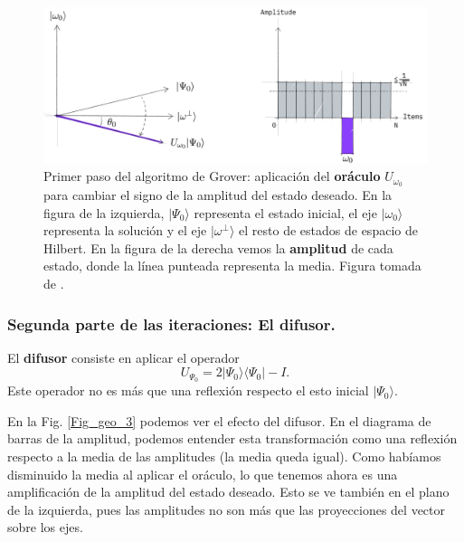 \documentclass[a4paper,11pt]{article} %
\numberwithin{equation}{section}
\begin{document}
	\begin{figure}[H]
	\centering 
	\includegraphics[width=0.85\linewidth]{Figuras/Fig_geo_2.png}
	\caption{Primer paso del algoritmo de Grover: aplicación del \textbf{oráculo} $U_{\omega_0}$ 
	para cambiar el signo de la amplitud del estado deseado. En la figura de la izquierda, 
	$| \Psi_0 \rangle$ representa el estado inicial, el eje $|\omega_0 \rangle $ 
	representa la solución y el eje $| \omega^{\perp} \rangle$ el resto de estados de espacio de Hilbert. 
	En la figura de la derecha vemos la \textbf{amplitud} de cada estado, donde la línea punteada 
	representa la media. Figura tomada de \cite{Qiskit-Grover}.}
	\label{Fig_geo_2}
	\end{figure}







\subsubsection{Segunda parte de las iteraciones: El difusor.}

El \textbf{difusor} consiste en aplicar el operador 
\begin{equation} \label{ec_geo_Us}
\boxed{U_{\Psi_0} = 2 |\Psi_0 \rangle \langle \Psi_0 | - I }.
\end{equation}
Este operador no es más que una reflexión respecto el esto inicial $|\Psi_0 \rangle$.


En la Fig. \ref{Fig_geo_3} podemos ver el efecto del difusor.  En el diagrama de barras de la amplitud, podemos entender esta transformación como una reflexión respecto a la media de las amplitudes (la media queda igual). Como habíamos disminuido la media al aplicar el oráculo, lo que tenemos ahora es una amplificación de la amplitud del estado deseado. Esto se ve también en el plano de la izquierda, pues las amplitudes no son más que las proyecciones del vector sobre los ejes. 
\end{document}
